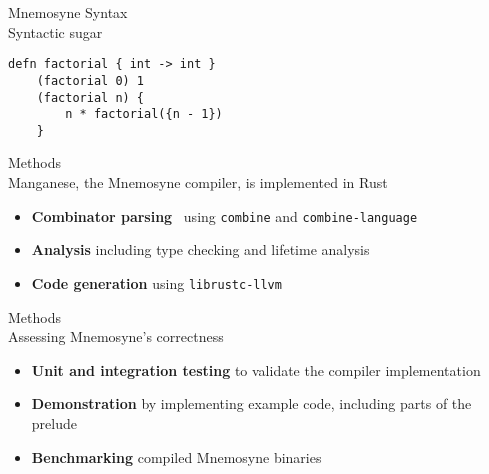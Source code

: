 \documentclass{beamer}
\begin{document}
\begin{frame}[fragile]
\alert{\huge{Mnemosyne Syntax}}\\
\large{Syntactic sugar}\normalsize
\begin{verbatim}
defn factorial { int -> int }
    (factorial 0) 1
    (factorial n) {
        n * factorial({n - 1})
    }
\end{verbatim}
\end{frame}


\begin{frame}
\alert{\huge{Methods}}\\
\large{Manganese, the Mnemosyne compiler, is implemented in Rust}\normalsize
\begin{itemize}
    \item \textbf{Combinator parsing}~\cite{Danielsson:2010:TPC:1932681.1863585,frost2008parser,swierstra2001combinator,hutton1996monadic} using \texttt{combine} and \texttt{combine-language}
    \item \textbf{Analysis} including type checking and lifetime analysis~\cite{Matsakis:2014:RL:2663171.2663188,sobalvarro1988lifetime}
    \item \textbf{Code generation} using \texttt{librustc-llvm}~\cite{Lattner:2004:LCF:977395.977673}
\end{itemize}
\end{frame}

\begin{frame}
\alert{\huge{Methods}}\\
\large{Assessing Mnemosyne's correctness}\normalsize
\begin{itemize}
    \item \textbf{Unit and integration testing} to validate the compiler implementation
    \item \textbf{Demonstration} by implementing example code, including parts of the prelude
    \item \textbf{Benchmarking} compiled Mnemosyne binaries
\end{itemize}
\end{frame}
\end{document}
